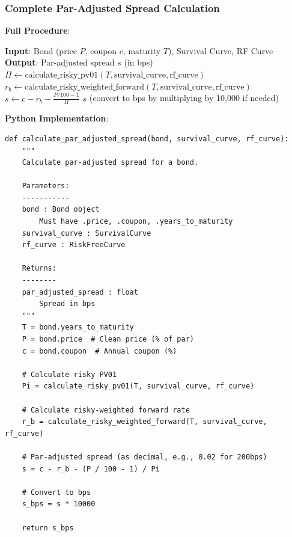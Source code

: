 \documentclass[11pt,a4paper]{article}
\begin{document}
\subsubsection{Complete Par-Adjusted Spread Calculation}

\begin{implbox}
\textbf{Full Procedure}:

\begin{algorithm}[H]
\caption{Calculate Par-Adjusted Spread}
\begin{algorithmic}[1]
\STATE \textbf{Input}: Bond (price $P$, coupon $c$, maturity $T$), Survival Curve, RF Curve
\STATE \textbf{Output}: Par-adjusted spread $s$ (in bps)
\STATE
\STATE $\Pi \gets \text{calculate\_risky\_pv01}(T, \text{survival\_curve}, \text{rf\_curve})$
\STATE $r_b \gets \text{calculate\_risky\_weighted\_forward}(T, \text{survival\_curve}, \text{rf\_curve})$
\STATE
\STATE $s \gets c - r_b - \frac{P/100 - 1}{\Pi}$
\STATE
\RETURN $s$ (convert to bps by multiplying by 10,000 if needed)
\end{algorithmic}
\end{algorithm}

\textbf{Python Implementation}:
\begin{lstlisting}
def calculate_par_adjusted_spread(bond, survival_curve, rf_curve):
    """
    Calculate par-adjusted spread for a bond.
    
    Parameters:
    -----------
    bond : Bond object
        Must have .price, .coupon, .years_to_maturity
    survival_curve : SurvivalCurve
    rf_curve : RiskFreeCurve
    
    Returns:
    --------
    par_adjusted_spread : float
        Spread in bps
    """
    T = bond.years_to_maturity
    P = bond.price  # Clean price (% of par)
    c = bond.coupon  # Annual coupon (%)
    
    # Calculate risky PV01
    Pi = calculate_risky_pv01(T, survival_curve, rf_curve)
    
    # Calculate risky-weighted forward rate
    r_b = calculate_risky_weighted_forward(T, survival_curve, rf_curve)
    
    # Par-adjusted spread (as decimal, e.g., 0.02 for 200bps)
    s = c - r_b - (P / 100 - 1) / Pi
    
    # Convert to bps
    s_bps = s * 10000
    
    return s_bps
\end{lstlisting}
\end{implbox}
\end{document}
